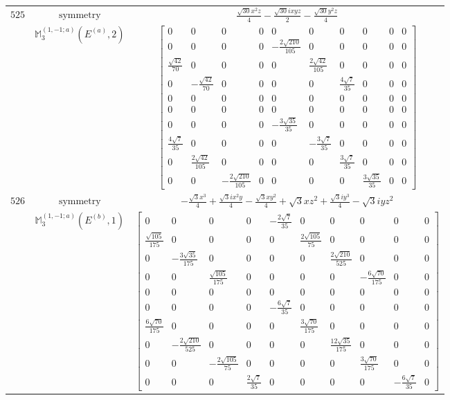 \documentclass[fleqn,8pt,landscape]{jsarticle}
\begin{document}
\begin{longtable}{ccc}
$ 525 $ & $ \text{symmetry} $ & $ \frac{\sqrt{30} x^{2} z}{4} - \frac{\sqrt{30} i x y z}{2} - \frac{\sqrt{30} y^{2} z}{4} $ \\
$  $ & $ \mathbb{M}_{3}^{(1,-1;a)}(E^{(a)},2) $ & $ \begin{bmatrix} 0 & 0 & 0 & 0 & 0 & 0 & 0 & 0 & 0 & 0 \\ 0 & 0 & 0 & 0 & - \frac{2 \sqrt{210}}{105} & 0 & 0 & 0 & 0 & 0 \\ \frac{\sqrt{42}}{70} & 0 & 0 & 0 & 0 & \frac{2 \sqrt{42}}{105} & 0 & 0 & 0 & 0 \\ 0 & - \frac{\sqrt{42}}{70} & 0 & 0 & 0 & 0 & \frac{4 \sqrt{7}}{35} & 0 & 0 & 0 \\ 0 & 0 & 0 & 0 & 0 & 0 & 0 & 0 & 0 & 0 \\ 0 & 0 & 0 & 0 & 0 & 0 & 0 & 0 & 0 & 0 \\ 0 & 0 & 0 & 0 & - \frac{3 \sqrt{35}}{35} & 0 & 0 & 0 & 0 & 0 \\ \frac{4 \sqrt{7}}{35} & 0 & 0 & 0 & 0 & - \frac{3 \sqrt{7}}{35} & 0 & 0 & 0 & 0 \\ 0 & \frac{2 \sqrt{42}}{105} & 0 & 0 & 0 & 0 & \frac{3 \sqrt{7}}{35} & 0 & 0 & 0 \\ 0 & 0 & - \frac{2 \sqrt{210}}{105} & 0 & 0 & 0 & 0 & \frac{3 \sqrt{35}}{35} & 0 & 0 \end{bmatrix} $ \\ \hline
$ 526 $ & $ \text{symmetry} $ & $ - \frac{\sqrt{3} x^{3}}{4} + \frac{\sqrt{3} i x^{2} y}{4} - \frac{\sqrt{3} x y^{2}}{4} + \sqrt{3} x z^{2} + \frac{\sqrt{3} i y^{3}}{4} - \sqrt{3} i y z^{2} $ \\
$  $ & $ \mathbb{M}_{3}^{(1,-1;a)}(E^{(b)},1) $ & $ \begin{bmatrix} 0 & 0 & 0 & 0 & - \frac{2 \sqrt{7}}{35} & 0 & 0 & 0 & 0 & 0 \\ \frac{\sqrt{105}}{175} & 0 & 0 & 0 & 0 & \frac{2 \sqrt{105}}{75} & 0 & 0 & 0 & 0 \\ 0 & - \frac{3 \sqrt{35}}{175} & 0 & 0 & 0 & 0 & \frac{2 \sqrt{210}}{525} & 0 & 0 & 0 \\ 0 & 0 & \frac{\sqrt{105}}{175} & 0 & 0 & 0 & 0 & - \frac{6 \sqrt{70}}{175} & 0 & 0 \\ 0 & 0 & 0 & 0 & 0 & 0 & 0 & 0 & 0 & 0 \\ 0 & 0 & 0 & 0 & - \frac{6 \sqrt{7}}{35} & 0 & 0 & 0 & 0 & 0 \\ \frac{6 \sqrt{70}}{175} & 0 & 0 & 0 & 0 & \frac{3 \sqrt{70}}{175} & 0 & 0 & 0 & 0 \\ 0 & - \frac{2 \sqrt{210}}{525} & 0 & 0 & 0 & 0 & \frac{12 \sqrt{35}}{175} & 0 & 0 & 0 \\ 0 & 0 & - \frac{2 \sqrt{105}}{75} & 0 & 0 & 0 & 0 & \frac{3 \sqrt{70}}{175} & 0 & 0 \\ 0 & 0 & 0 & \frac{2 \sqrt{7}}{35} & 0 & 0 & 0 & 0 & - \frac{6 \sqrt{7}}{35} & 0 \end{bmatrix} $ \\ \hline

\end{longtable}
\end{document}

